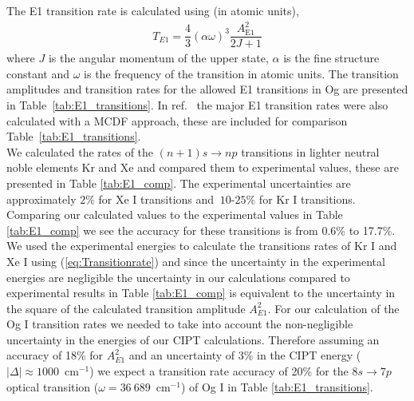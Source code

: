 \documentclass[10pt,a4paper, twoside]{report}
\begin{document}
The E1 transition rate is calculated using (in atomic units),
\begin{align} \label{eq:Transitionrate}
T_{E1} = \dfrac{4}{3}\left(\alpha \omega\right)^3\dfrac{ A_{\text{E1}}^2}{2J + 1}
\end{align}
where $J$ is the angular momentum of the upper state, $\alpha$ is the fine structure constant and $\omega$ is the frequency of the transition in atomic units. The transition amplitudes and transition rates for the allowed E1 transitions in Og are presented in Table~\ref{tab:E1_transitions}. In ref.~\cite{Indelicato2007} the major E1 transition rates were also calculated with a MCDF approach, these are included for comparison Table~\ref{tab:E1_transitions}. \\
\linebreak
We calculated the  rates of the $(n+1)s \rightarrow np$ transitions in lighter neutral noble elements Kr and Xe  and compared them to experimental values, these are presented in Table \ref{tab:E1_comp}. The experimental uncertainties are approximately $2\%$ for Xe I transitions \cite{Xe_BSD} and $~10$-$25\%$ for Kr I transitions\cite{Kr_BSD}. Comparing our calculated values to the experimental values in Table \ref{tab:E1_comp} we see the accuracy for these transitions is from 0.6\% to 17.7\%. We used the experimental energies to calculate the transitions rates of Kr I and Xe I using (\ref{eq:Transitionrate}) and since the uncertainty in the experimental energies are negligible the uncertainty in our calculations compared to experimental results in Table \ref{tab:E1_comp} is equivalent to the uncertainty in the square of the calculated transition amplitude $A_{E1}^2$. For our calculation of the Og I transition rates we needed to take into account the non-negligible uncertainty in the energies of our CIPT calculations.  Therefore assuming an accuracy of 18\% for $A_{E1}^2$ and an uncertainty of 3\% in the CIPT energy ($\left|\Delta\right| \approx 1000$~cm$^{-1}$) we expect a transition rate accuracy of 20\% for the $8s \rightarrow 7p$ optical transition ($\omega = 36~689$~cm$^{-1}$) of Og I in Table \ref{tab:E1_transitions}.  \\
\end{document}
